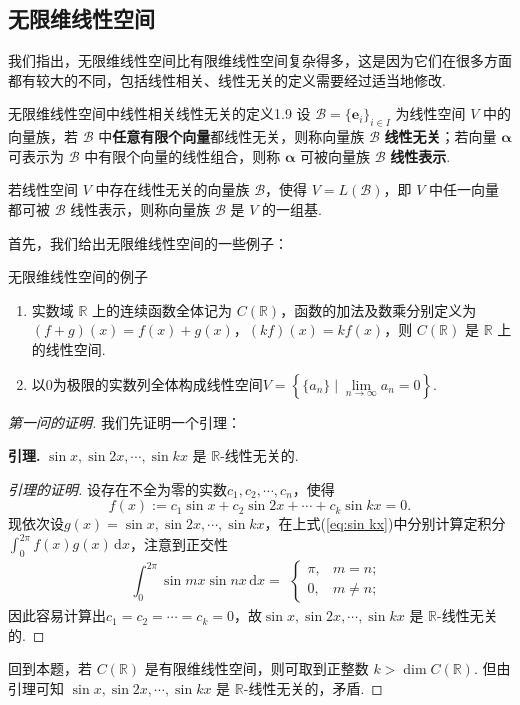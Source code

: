 \documentclass[12pt, a4paper,newtx]{ctexart}
\begin{document}
\subsection{无限维线性空间}\label{section1.4}
我们指出，无限维线性空间比有限维线性空间复杂得多，这是因为它们在很多方面都有较大的不同，包括线性相关、线性无关的定义需要经过适当地修改. 
\begin{definition}{无限维线性空间中线性相关线性无关的定义}{1.9}
	设 $\mathscr B = \{\bm e_i\}_{i \in I}$ 为线性空间 $V$ 中的向量族，若 $\mathscr B$ 中\textbf{任意有限个向量}都线性无关，则称向量族 $\mathscr B$ \textbf{线性无关}；若向量 $\bm\alpha$ 可表示为 $\mathscr B$ 中有限个向量的线性组合，则称 $\bm \alpha$ 可被向量族 $\mathscr B$ \textbf{线性表示}. 
	
	若线性空间 $V$ 中存在线性无关的向量族 $\mathscr B$，使得 $V = L(\mathscr B)$，即 $V$ 中任一向量都可被 $\mathscr B$ 线性表示，则称向量族 $\mathscr B$ 是 $V$ 的一组基. 
\end{definition}
首先，我们给出无限维线性空间的一些例子：
\begin{example}{无限维线性空间的例子}{}
	\begin{enumerate}
		\item 实数域 $ \mathbb{R} $ 上的连续函数全体记为 $ C(\mathbb{R}) $，函数的加法及数乘分别定义为 $ (f+g)(x) = f(x) + g(x) $，$ (kf)(x) = kf(x) $，则 $ C(\mathbb{R}) $ 是 $ \mathbb{R} $ 上的线性空间. 
		\item 以$0$为极限的实数列全体构成线性空间$V=\left\{\{a_n\}\mid\lim\limits_{n\to\infty}a_n=0\right\}. $
	\end{enumerate}
\end{example}
\begin{proof}[第一问的证明]
	我们先证明一个引理：
	
	\textbf{引理. }$\sin x, \sin 2x, \cdots, \sin kx$ 是 $\mathbb{R}$-线性无关的. 
	\begin{proof}[引理的证明]
		设存在不全为零的实数$c_1,c_2,\cdots,c_n$，使得\begin{equation}\label{eq:sin kx}
			f(x):=c_1\sin x+c_2\sin2x+\cdots+c_k\sin kx=0.
		\end{equation}
		现依次设$g(x)=\sin x,\sin 2x,\cdots,\sin kx$，在上式(\ref{eq:sin kx})中分别计算定积分$\displaystyle \int_0^{2\pi}f(x)g(x)\,\mathrm dx$，注意到正交性\[\int_0^{2\pi}\sin mx\sin nx\,\mathrm dx=\begin{aligned}
		\begin{cases}
			\pi,& m=n;\\0,& m\ne n;
		\end{cases}
		\end{aligned}\]因此容易计算出$c_1=c_2=\cdots=c_k=0$，故$\sin x, \sin 2x, \cdots, \sin kx$ 是 $\mathbb{R}$-线性无关的.
	\end{proof}
	回到本题，若 $C(\mathbb{R})$ 是有限维线性空间，则可取到正整数 $k > \dim C(\mathbb{R})$. 但由引理可知 $\sin x, \sin 2x, \cdots, \sin kx$ 是 $\mathbb{R}$-线性无关的，矛盾. 
\end{proof}
\end{document}

